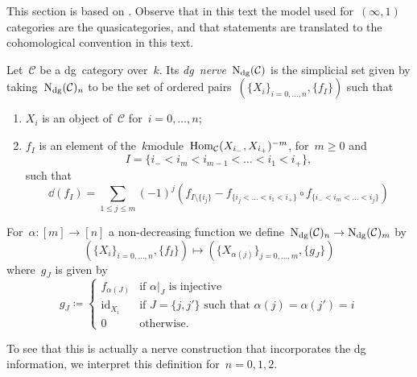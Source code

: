 This section is based on \cite[section 1.3.1]{ha}. Observe that in this text the model used for~$(\infty,1)$\dash categories are the quasicategories, and that statements are translated to the cohomological convention in this text.

\begin{definition}
  \label{definition:dg-nerve}
  Let~$\mathcal{C}$ be a dg~category over~$k$. Its \emph{dg~nerve}~$\operatorname{N}_{\mathrm{dg}}(\mathcal{C})$ is the simplicial set given by taking~$\operatorname{N}_{\mathrm{dg}}(\mathcal{C})_n$ to be the set of ordered pairs~$(\{X_i\}_{i=0,\dotsc,n},\{f_I\})$ such that
  \begin{enumerate}
    \item $X_i$ is an object of~$\mathcal{C}$ for~$i=0,\dotsc,n$;
    \item $f_I$ is an element of the~$k$\dash module~$\mathrm{Hom}_{\mathcal{C}}(X_{i_-},X_{i_+})^{-m}$, for~$m\geq 0$ and
      \begin{equation}
        I=\{i_-<i_m<i_{m-1}<\dotso<i_1<i_+\},
      \end{equation}
      such that
      \begin{equation}
        \dd(f_I)=\sum_{1\leq j\leq m}(-1)^j\left( f_{I\setminus\{i_j\}}-f_{\{i_j<\dotso<i_1<i_+\}}\circ f_{\{i_-<i_m<\dotso<i_j\}} \right)
      \end{equation}
  \end{enumerate}
  For~$\alpha\colon[m]\to[n]$ a non-decreasing function we define~$\operatorname{N}_{\mathrm{dg}}(\mathcal{C})_n\to\operatorname{N}_{\mathrm{dg}}(\mathcal{C})_m$ by
  \begin{equation}
    \left( \{X_i\}_{i=0,\dotsc,n},\{f_I\} \right)\mapsto\left( \{X_{\alpha(j)}\}_{j=0,\dotsc,m},\{g_J\} \right)
  \end{equation}
  where~$g_J$ is given by
  \begin{equation}
    g_J\coloneqq
    \begin{cases}
      f_{\alpha(J)} & \text{if~$\alpha|_J$ is injective} \\
      \mathrm{id}_{X_i} & \text{if~$J=\{j,j'\}$ such that~$\alpha(j)=\alpha(j')=i$} \\
      0 & \text{otherwise}.
    \end{cases}
  \end{equation}
\end{definition}
To see that this is actually a nerve construction that incorporates the dg information, we interpret this definition for~$n=0,1,2$.
